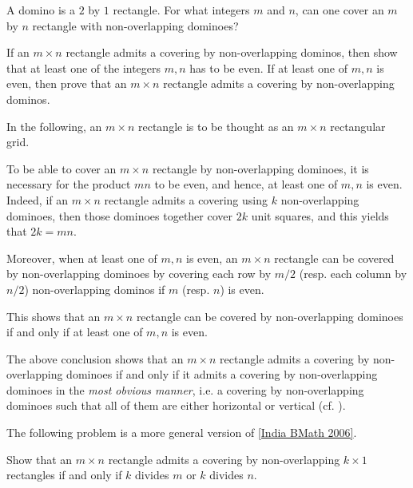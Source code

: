 \begin{example}
\label{India BMath 2006}
A domino is a $2$ by $1$ rectangle. For what integers $m$ and $n$, can one cover an $m$ by $n$ rectangle with non-overlapping dominoes?
\end{example}

\walkthrough
\begin{walk}
		\ii If an $m\times n$ rectangle admits a covering by non-overlapping dominos, then show that at least one of the integers $m,n$ has to be even. 
		\ii If at least one of $m,n$ is even, then prove that an $m\times n$ rectangle admits a covering by non-overlapping dominos.
\end{walk}


\begin{soln}
In the following, an $m\times n$ rectangle is to be thought as an $m\times n$ rectangular grid. 

To be able to cover an $m\times n$ rectangle by non-overlapping dominoes, it is necessary for the product $mn$ to be even, and hence, at least one of $m, n$ is even. 
Indeed, if an $m\times n$ rectangle admits a covering using $k$ non-overlapping dominoes, then those dominoes together cover $2k$ unit squares, 
and this yields that $2k = mn$. 

Moreover, when at least one of $m, n$ is even, an $m\times n$ rectangle can be covered by non-overlapping dominoes by 
covering each row by $m/2$ (resp. each column by $n/2$) non-overlapping dominos if $m$ (resp. $n$) is even. 

This shows that an $m\times n$ rectangle can be covered by non-overlapping dominoes if and only if at least one of $m,n$ is even. 
\end{soln}

\begin{remark}
The above conclusion shows that 
an $m\times n$ rectangle admits a covering by non-overlapping dominoes if and only if 
it admits a covering by non-overlapping dominoes in the \emph{most obvious manner}, i.e. a covering by non-overlapping dominoes such that all of them are either horizontal or vertical
(cf. \cite[p. 6]{BrualdiIntroCombi}). 
\end{remark}

The following problem is a more general version of \cref{India BMath 2006}. 

\begin{example}
\cite[Problem 8, Chapter 2, p. 26]{EngelProblemSolvingStrategies}
Show that an $m\times n$ rectangle admits a covering by non-overlapping $k\times 1$ rectangles if and only if $k$ divides $m$ or $k$ divides $n$. 
\end{example}
